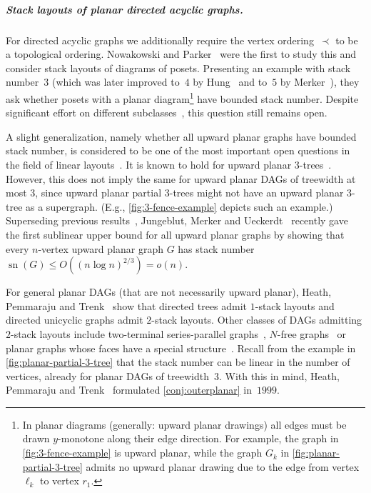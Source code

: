 \documentclass{article}
\DeclareMathOperator{\sn}{sn}
\begin{document}
\subparagraph{Stack layouts of planar directed acyclic graphs.}
For directed acyclic graphs we additionally require the vertex ordering~$\prec$ to be a topological ordering.
Nowakowski and Parker~\cite{Nowakowski1989_DirectedStackNumer} were the first to study this and consider stack layouts of diagrams of posets.
Presenting an example with stack number~$3$ (which was later improved to~$4$ by Hung~\cite{Hung1993_Poset4Stacks} and to~$5$ by Merker~\cite{Merker2020_Thesis}), they ask whether posets with a planar diagram\footnote{In planar diagrams (generally: upward planar drawings) all edges must be drawn $y$-monotone along their edge direction. For example, the graph in \cref{fig:3-fence-example} is upward planar, while the graph $G_k$ in \cref{fig:planar-partial-3-tree} admits no upward planar drawing due to the edge from vertex $\ell_k$ to vertex $r_1$.} have bounded stack number.
Despite significant effort on different subclasses~\cite{Syslo1990_Posets,Alzohairi1997_SeriesParallelPosets,Heath1997_Posets,Heath1999_DAGs2,Heath1999_DAGs1,Alzohairi2001_Lattices,Alhashem2015_StacksPoset}, this question still remains open.

A slight generalization, namely whether all upward planar graphs have bounded stack number, is considered to be one of the most important open questions in the field of linear layouts~\cite{Frati2013_UpwardStackNumber,Noellenburg2021_DAGsWithConstantStackNumber,Jungeblut2022_SublinearUpperBound}.
It is known to hold for upward planar $3$-trees~\cite{Frati2013_UpwardStackNumber,Noellenburg2021_DAGsWithConstantStackNumber}.
However, this does not imply the same for upward planar DAGs of treewidth at most $3$, since upward planar partial $3$-trees might not have an upward planar $3$-tree as a supergraph.
(E.g., \cref{fig:3-fence-example} depicts such an example.)
Superseding previous results~\cite{Frati2013_UpwardStackNumber}, Jungeblut, Merker and Ueckerdt~\cite{Jungeblut2022_SublinearUpperBound} recently gave the first sublinear upper bound for all upward planar graphs by showing that every $n$-vertex upward planar graph $G$ has stack number $\sn(G) \leq O((n \log n)^{2/3}) = o(n)$.

For general planar DAGs (that are not necessarily upward planar), Heath, Pemmaraju and Trenk~\cite{Heath1999_DAGs1} show that directed trees admit $1$-stack layouts and directed unicyclic graphs admit $2$-stack layouts.
Other classes of DAGs admitting $2$-stack layouts include two-terminal series-parallel graphs~\cite{DiGiacomo2006_SeriesParallel}, $N$-free graphs~\cite{Mchedlidze2009_HamiltonianCompletion} or planar graphs whose faces have a special structure~\cite{Binucci2019_UpwardStackST}.
Recall from the example in \cref{fig:planar-partial-3-tree} that the stack number can be linear in the number of vertices, already for planar DAGs of treewidth~$3$.
With this in mind, Heath, Pemmaraju and Trenk~\cite{Heath1999_DAGs1} formulated \cref{conj:outerplanar} in~$1999$.
\end{document}
